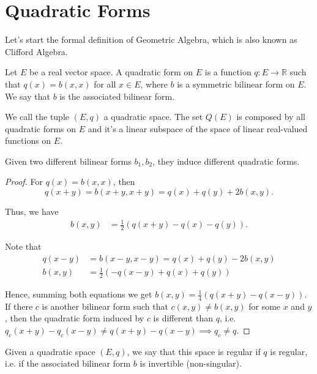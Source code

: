 \section{Quadratic Forms}

Let's start the formal definition of Geometric Algebra, which is also known as
Clifford Algebra.

\begin{definition}
	Let $E$ be a real vector space. A quadratic
	form on $E$ is a function $q:E \to \mathbb R$
	such that $q(x) = b(x,x)$ for all $x \in E$,
	where $b$ is a symmetric bilinear form on $E$.
	We say that $b$ is the associated bilinear form.

	We call the tuple $(E,q)$ a quadratic space.
	The set $Q(E)$ is composed by all quadratic forms on $E$
	and it's a linear subspace of the space of linear real-valued
	functions on $E$.
\end{definition}

\begin{proposition}
	Given two different bilinear forms $b_1, b_2$, they induce
	different quadratic forms.
\end{proposition}
\begin{proof}
	For $q(x) = b(x,x)$, then
	\begin{displaymath}
		q(x+y) = b(x+y,x+y) = q(x) + q(y) + 2b(x,y).
	\end{displaymath}

	Thus, we have
	\begin{align*}
		b(x,y) & = \frac{1}{2} \left(
		q(x+y) - q(x) - q(y)
		\right).
	\end{align*}

	Note that
	\begin{align*}
		q(x-y) & = b(x-y,x-y) = q(x) + q(y) - 2b(x,y) \\
		b(x,y) & = \frac{1}{2} \left(
		-q(x-y) + q(x) + q(y)
		\right)
	\end{align*}

	Hence, summing both equations we get
	$b(x,y) = \frac{1}{4}(q(x+y) - q(x-y))$.
	If there $c$ is another bilinear form such that
	$c(x,y) \neq b(x,y)$ for some $x$ and $y$, then
	the quadratic form induced by $c$ is different than $q$, i.e.
	$q_c(x+y) - q_c(x-y) \neq q(x+y) - q(x-y) \implies q_c \neq q$.
\end{proof}

\begin{definition}
	Given a quadratic space $(E, q)$, we say that this space
	is regular if $q$ is regular, i.e. if the associated bilinear form $b$
	is invertible (non-singular).
\end{definition}
